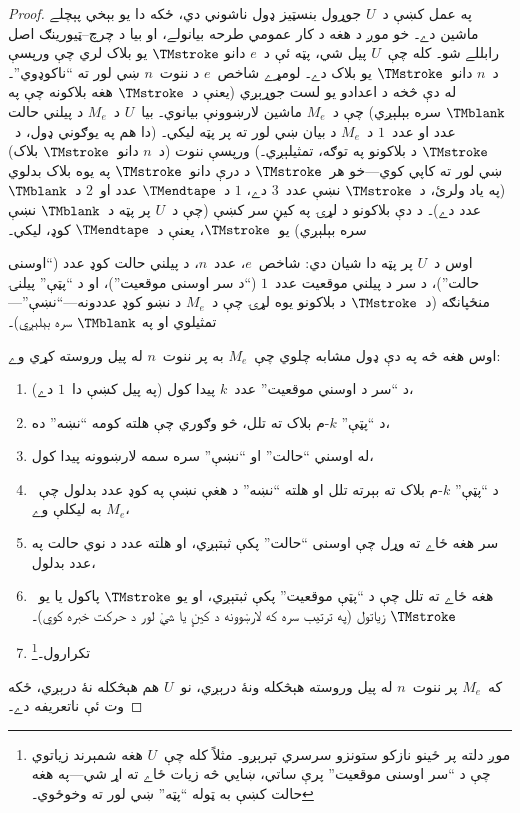 \documentclass[../../../include/open-logic-section]{subfiles}
\begin{document}
\begin{proof}
  په عمل کښې د~$U$ جوړول بنسټيز ډول ناشوني دي، ځکه دا يو بېخي پېچلے
  ماشين دے۔ خو موږ د هغه د کار عمومي طرحه بيانولے، او بيا د
  چرچ--ټيورينګ اصل رابللے شو۔ کله چې~$U$ پيل شي، پټه ئې د~$e$ دانو
  $\TMstroke$ يو بلاک لري چې ورپسې د~$n$ دانو~$\TMstroke$ يو بلاک
  دے۔ لومړے شاخص~$e$ د ننوت~$n$ ښي لور ته ``ناکوډوي''۔ له دې څخه د
  اعدادو يو لست جوړېږي (يعنې د~$\TMstroke$ هغه بلاکونه چې په
  $\TMblank$ سره بېلېږي) چې د~$M_e$ ماشين لارښوونې بيانوي۔ بيا~$U$
  د~$M_e$ د پيلني حالت عدد او عدد~$1$ د~$M_e$ د بيان ښي لور ته پر
  پټه ليکي۔ (دا هم په يوګوني ډول، د~$\TMstroke$ د بلاکونو په توګه،
  تمثيلېږي۔) ورپسې ننوت (د~$n$ دانو~$\TMstroke$ بلاک) ښي لور ته
  کاپي کوي---خو هر~$\TMstroke$ د درې دانو~$\TMstroke$ په يوه بلاک
  بدلوي (په ياد ولرئ، د~$\TMstroke$ نښې عدد~$3$ دے، $1$ د~$\TMendtape$
  عدد او~$2$ د~$\TMblank$ عدد دے)۔ د دې بلاکونو د لړۍ په کيڼ سر کښې
  (چې د~$U$ پر پټه د~$\TMblank$ نښې سره بېلېږي) يو~$\TMstroke$، يعنې
  د~$\TMendtape$ کوډ، ليکي۔

  اوس د~$U$ پر پټه دا شيان دي: شاخص~$e$، عدد~$n$، د پيلني حالت کوډ
  عدد (``اوسنی حالت'')، د سر د پيلني موقعيت عدد~$1$ (``د سر اوسنی
  موقعيت'')، او د ``پټې'' پيلنۍ منځپانګه (د~$\TMstroke$ د بلاکونو
  يوه لړۍ چې د~$M_e$ د نښو کوډ عددونه---``نښې''---تمثيلوي او په
  $\TMblank$ سره بېلېږي)۔

  اوس هغه څه په دې ډول مشابه چلوي چې~$M_e$ به پر ننوت~$n$ له پيل
  وروسته کړي وے:
  \begin{enumerate}
    \item د ``سر د اوسني موقعيت'' عدد~$k$ پيدا کول (په پيل کښې دا~$1$
    دے)،
    \item د ``پټې'' $k$-م بلاک ته تلل، څو وګوري چې هلته کومه ``نښه''
    ده،
    \item{}%
    له اوسني ``حالت'' او ``نښې'' سره سمه لارښوونه پيدا کول،
    \item د ``پټې'' $k$-م بلاک ته بېرته تلل او هلته ``نښه'' د هغې
    نښې په کوډ عدد بدلول چې~$M_e$ به ليکلې وے،
    \item سر هغه ځاے ته وړل چې اوسنی ``حالت'' پکې ثبتېږي، او هلته
    عدد د نوي حالت په عدد بدلول،
    \item هغه ځاے ته تلل چې د ``پټې موقعيت'' پکې ثبتېږي، او يو
    $\TMstroke$ پاکول يا يو~$\TMstroke$ زياتول (په ترتيب سره که
    لارښوونه د کيڼ يا ښي لور د حرکت خبره کوي)۔
    \item تکرارول۔\footnote{موږ دلته پر ځينو نازکو ستونزو سرسري
    تېرېږو۔ مثلاً کله چې~$U$ هغه شمېرند زياتوي چې د ``سر اوسنی
    موقعيت'' پرې ساتي، ښايي څه زيات ځاے ته اړ شي---په هغه حالت کښې
    به ټوله ``پټه'' ښي لور ته وخوځوي۔}
  \end{enumerate}
  که~$M_e$ پر ننوت~$n$ له پيل وروسته هېڅکله ونۀ درېږي، نو~$U$ هم
  هېڅکله نۀ درېږي، ځکه وت ئې ناتعريفه دے۔


\end{proof}
\end{document}
